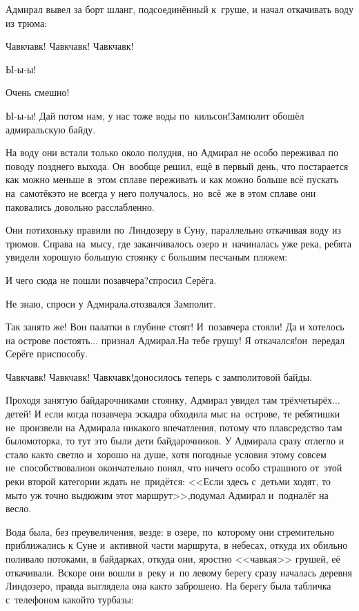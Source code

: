 Адмирал вывел за борт шланг, подсоединённый к~груше, и начал откачивать воду из трюма:

\diagdash Чавк\sdash чавк! Чавк\sdash чавк! Чавк\sdash чавк!

\diagdash Ы-ы-ы!

\diagdash Очень смешно!

\diagdash Ы-ы-ы! Дай потом нам, у нас тоже воды по~кильсон!\mdash Замполит обошёл адмиральскую байду.

На воду они встали только около полудня, но Адмирал не особо переживал по поводу позднего выхода. Он~вообще решил, ещё в первый день, что постарается как можно меньше в~этом сплаве переживать и как можно больше всё пускать на~самотёк\mdash это не всегда у него получалось, но~всё~же в этом сплаве они паковались довольно расслабленно.

Они потихоньку правили по~Линдозеру в Суну, параллельно откачивая воду из трюмов. Справа на~мысу, где заканчивалось озеро и~начиналась уже река, ребята увидели хорошую большую стоянку с большим песчаным пляжем:

\diagdash И чего сюда не пошли позавчера?\mdash спросил Серёга.

\diagdash Не знаю, спроси у Адмирала.\mdash отозвался Замполит.

\diagdash Так занято же! Вон палатки в глубине стоят! И~позавчера стояли! Да и хотелось на острове постоять$\ldots$ \mdash признал Адмирал.\mdash На тебе грушу! Я откачался!\mdash он~передал Серёге приспособу.

\diagdash Чавк\sdash чавк! Чавк\sdash чавк! Чавк\sdash чавк!\mdash доносилось теперь с замполитовой байды.

Проходя занятую байдарочниками стоянку, Адмирал увидел там трёх\sdash четырёх$\ldots$ детей! И если когда позавчера эскадра обходила мыс на~острове, те ребятишки не~произвели на Адмирала никакого впечатления, потому что плавсредство там было\mdash моторка, то тут это были дети байдарочников. У Адмирала сразу отлегло и стало как\sdash то светло и~хорошо на душе, хотя погодные условия этому совсем не~способствовали\mdash он окончательно понял, что ничего особо страшного от~этой реки второй категории ждать не~придётся: <<Если здесь с~детьми ходят, то мы\sdash то уж точно выдюжим этот маршрут>>,\mdash подумал Адмирал и~подналёг на весло.

Вода была, без преувеличения, везде: в озере, по~которому они стремительно приближались к Суне и~активной части маршрута, в небесах, откуда их обильно поливало потоками, в байдарках, откуда они, яростно <<чавкая>> грушей, её откачивали. Вскоре они вошли в~реку и~по левому берегу сразу началась деревня Линдозеро, правда выглядела она как\sdash то заброшено. На берегу была табличка с~телефоном какой\sdash то турбазы:

